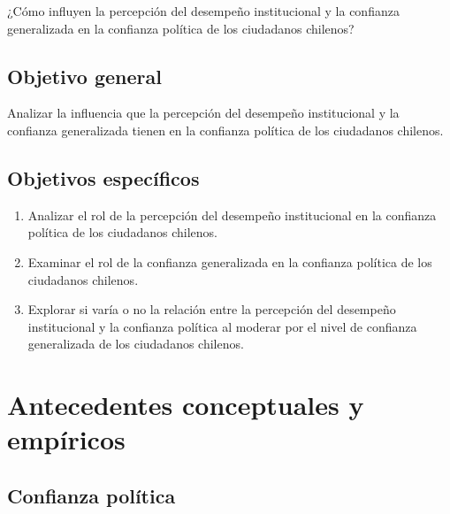 \documentclass[12pt,twoside]{templates/facsothesis}
\providecommand{\tightlist}{%
  \setlength{\itemsep}{0pt}\setlength{\parskip}{0pt}}
\begin{document}
¿Cómo influyen la percepción del desempeño institucional y la confianza generalizada en la confianza política de los ciudadanos chilenos?

\section{Objetivo general}\label{objetivo-general}

Analizar la influencia que la percepción del desempeño institucional y la confianza generalizada tienen en la confianza política de los ciudadanos chilenos.

\section{Objetivos específicos}\label{objetivos-especuxedficos}

\begin{enumerate}
\def\labelenumi{\arabic{enumi}.}
\tightlist
\item
  Analizar el rol de la percepción del desempeño institucional en la confianza política de los ciudadanos chilenos.
\item
  Examinar el rol de la confianza generalizada en la confianza política de los ciudadanos chilenos.
\item
  Explorar si varía o no la relación entre la percepción del desempeño institucional y la confianza política al moderar por el nivel de confianza generalizada de los ciudadanos chilenos.
\end{enumerate}

\chapter{Antecedentes conceptuales y empíricos}\label{antecedentes-conceptuales-y-empuxedricos}

\section{Confianza política}\label{confianza-poluxedtica}
\end{document}
